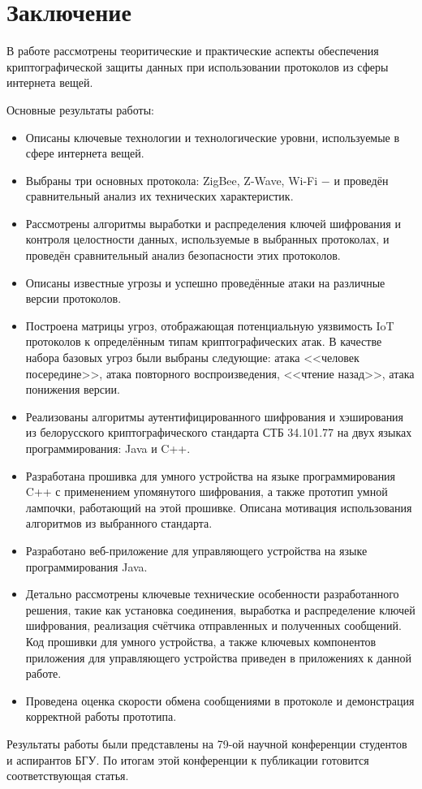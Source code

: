 \chapter*{Заключение}
	
	В работе рассмотрены теоритические и практические аспекты обеспечения криптографической защиты 
	данных при использовании протоколов из сферы интернета вещей.
	
	Основные результаты работы:
	
	\begin{itemize}
		\item Описаны ключевые технологии и технологические уровни, используемые в сфере интернета вещей.
		\item Выбраны три основных протокола: ZigBee, Z-Wave, Wi-Fi $-$ и проведён сравнительный анализ
		их технических характеристик.
		\item Рассмотрены алгоритмы выработки и распределения ключей шифрования и контроля целостности
		данных, используемые в выбранных протоколах, и проведён сравнительный анализ безопасности этих
		протоколов.
		\item Описаны известные угрозы и успешно проведённые атаки на различные версии протоколов.
		\item Построена матрицы угроз, отображающая потенциальную уязвимость IoT протоколов к 
		определённым типам криптографических атак. В качестве набора базовых угроз были выбраны 
		следующие: атака <<человек посередине>>, атака повторного воспроизведения, <<чтение назад>>, 
		атака понижения версии.
		\item Реализованы алгоритмы аутентифицированного шифрования и хэширования из белорусского 
		криптографического стандарта СТБ 34.101.77 на двух языках программирования: Java и C++.
		\item Разработана прошивка для умного устройства на языке программирования C++ с применением 
		упомянутого шифрования, а также прототип умной лампочки, работающий на этой прошивке. Описана 
		мотивация использования алгоритмов из выбранного стандарта.
		\item Разработано веб-приложение для управляющего устройства на языке программирования Java.
		\item Детально рассмотрены ключевые технические особенности разработанного решения, такие как 
		установка соединения, выработка и распределение ключей шифрования, реализация счётчика отправленных 
		и полученных сообщений. Код прошивки для умного устройства, а также ключевых компонентов приложения
		для управляющего устройства приведен в приложениях к данной работе.
		\item Проведена оценка скорости обмена сообщениями в протоколе и демонстрация корректной работы 
		прототипа.
	\end{itemize}

	Результаты работы были представлены на 79-ой научной конференции студентов и аспирантов БГУ.
	По итогам этой конференции к публикации готовится соответствующая статья.
